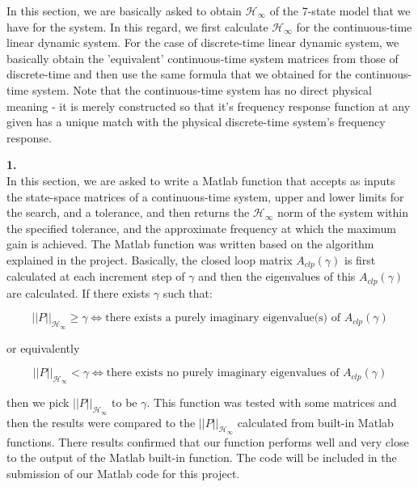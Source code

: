 \documentclass[paper=US leter, fontsize=11pt]{scrartcl}
\begin{document}
In this section, we are basically asked to obtain $\mathcal{H}_{\infty}$ of the 7-state model that we have for the system. In this regard, we first calculate $\mathcal{H}_{\infty}$ for the continuous-time linear dynamic system. For the case of discrete-time linear dynamic system, we basically obtain the 'equivalent' continuous-time system matrices from those of discrete-time and then use the same formula that we obtained for the continuous-time system. Note that the continuous-time system has no direct physical meaning - it is merely constructed so that it's frequency response function at any given has a unique match with the physical discrete-time system's frequency response.

\vspace{20pt}
\textbf{1.}\\
In this section, we are asked to write a Matlab function that accepts as inputs the state-space matrices of a continuous-time system,
upper and lower limits for the search, and a tolerance, and then returns the $\mathcal{H}_{\infty}$ norm of the system within the specified tolerance, and the approximate frequency at which the maximum
gain is achieved. The Matlab function was written based on the algorithm explained in the project. Basically, the closed loop matrix $A_{clp}(\gamma)$ is first calculated at each increment step of $\gamma$ and then the eigenvalues of this $A_{clp}(\gamma)$ are calculated. If there exists $\gamma$ such that:

\begin{equation*}
||P||_{\mathcal{H}_{\infty}} \geq \gamma \iff \text{there exists a purely imaginary eigenvalue(s) of $A_{clp}(\gamma)$}
\end{equation*}

or equivalently

\begin{equation*}
||P||_{\mathcal{H}_{\infty}} < \gamma \iff \text{there exists no purely imaginary eigenvalues of $A_{clp}(\gamma)$}
\end{equation*}

then we pick $||P||_{\mathcal{H}_{\infty}}$ to be $\gamma$. This function was tested with some matrices and then the results were compared to the $||P||_{\mathcal{H}_{\infty}}$ calculated from built-in Matlab functions. There results confirmed that our function performs well and very close to the output of the Matlab built-in function. The code will be included in the submission of our Matlab code for this project.
\end{document}
